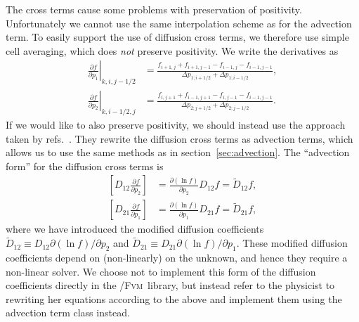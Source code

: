 \documentclass{notes}
\newcommand{\FVM}{\textsc{Fvm}}
\begin{document}
    The cross terms cause some problems with preservation of positivity.
    Unfortunately we cannot use the same interpolation scheme as for the
    advection term. To easily support the use of diffusion cross terms, we
    therefore use simple cell averaging, which does \emph{not} preserve
    positivity. We write the derivatives as
    \begin{equation}
        \begin{aligned}
            \left.\frac{\partial f}{\partial p_1}\right|_{k,i,j-1/2} &=
                \frac{f_{i+1,j} + f_{i+1,j-1} - f_{i-1,j} - f_{i-1,j-1}}
                {\Delta p_{1;i+1/2} + \Delta p_{1;i-1/2}},\\
            \left.\frac{\partial f}{\partial p_2}\right|_{k,i-1/2,j} &=
                \frac{f_{i,j+1} + f_{i-1,j+1} - f_{i,j-1} - f_{i-1,j-1}}
                {\Delta p_{2;j+1/2} + \Delta p_{2;j-1/2}}.
        \end{aligned}
    \end{equation}
    If we would like to also preserve positivity, we should instead use the
    approach taken by refs.~\cite{DuToit2018,Daniel2019}. They rewrite the
    diffusion cross terms as advection terms, which allows us to use the same
    methods as in section~\ref{sec:advection}. The ``advection form'' for the
    diffusion cross terms is
    \begin{equation}
        \begin{aligned}
            \left[ D_{12}\frac{\partial f}{\partial p_2} \right] &=
                \frac{\partial (\ln f)}{\partial p_2}D_{12} f = \tilde{D}_{12} f,\\
            \left[ D_{21}\frac{\partial f}{\partial p_1} \right] &=
                \frac{\partial (\ln f)}{\partial p_1}D_{21} f = \tilde{D}_{21} f,
        \end{aligned}
    \end{equation}
    where we have introduced the modified diffusion coefficients
    $\tilde{D}_{12}\equiv D_{12}\partial(\ln f)/\partial p_2$ and
    $\tilde{D}_{21}\equiv D_{21}\partial(\ln f)/\partial p_1$. These modified
    diffusion coefficients depend on (non-linearly) on the unknown, and hence
    they require a non-linear solver. We choose not to implement this form of
    the diffusion coefficients directly in the \DREAM/\FVM\ library, but instead
    refer to the physicist to rewriting her equations according to the above
    and implement them using the advection term class instead.
\end{document}
